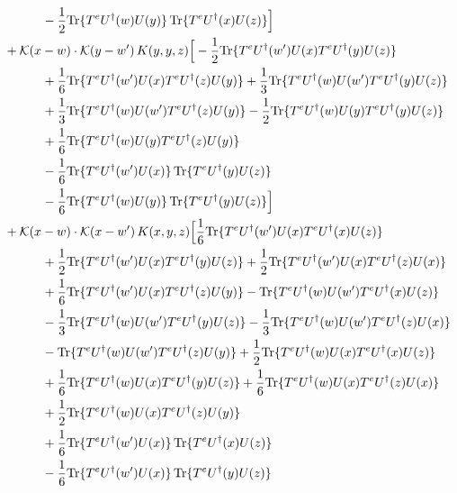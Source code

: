 \documentclass[10pt]{article}
\numberwithin{equation}{section}
\begin{document}
\begin{align}
&\quad\quad\quad-\frac{1}{2}{\rm Tr}\{T^eU^\dagger(w)U(y)\}\,{\rm Tr}\{T^eU^\dagger(x)U(z)\}\Big]\notag\\
&+\mathcal K(x-w)\cdot\mathcal K(y-w')\,K(y,y,z)\Big[-\frac{1}{2}{\rm Tr}\{T^eU^\dagger(w')U(x)T^eU^\dagger(y)U(z)\}\notag\\
&\quad\quad\quad+\frac{1}{6}{\rm Tr}\{T^eU^\dagger(w')U(x)T^eU^\dagger(z)U(y)\}+\frac{1}{3}{\rm Tr}\{T^eU^\dagger(w)U(w')T^eU^\dagger(y)U(z)\}\notag\\
&\quad\quad\quad+\frac{1}{3}{\rm Tr}\{T^eU^\dagger(w)U(w')T^eU^\dagger(z)U(y)\}-\frac{1}{2}{\rm Tr}\{T^eU^\dagger(w)U(y)T^eU^\dagger(y)U(z)\}\notag\\
&\quad\quad\quad+\frac{1}{6}{\rm Tr}\{T^eU^\dagger(w)U(y)T^eU^\dagger(z)U(y)\}\notag\\
&\quad\quad\quad-\frac{1}{6}{\rm Tr}\{T^eU^\dagger(w')U(x)\}\,{\rm Tr}\{T^eU^\dagger(y)U(z)\}\notag\\
&\quad\quad\quad-\frac{1}{6}{\rm Tr}\{T^eU^\dagger(w)U(y)\}\,{\rm Tr}\{T^eU^\dagger(y)U(z)\}\Big]\notag\\
&+\mathcal K(x-w)\cdot\mathcal K(x-w')\,K(x,y,z)\Big[\frac{1}{6}{\rm Tr}\{T^eU^\dagger(w')U(x)T^eU^\dagger(x)U(z)\}\notag\\
&\quad\quad\quad+\frac{1}{2}{\rm Tr}\{T^eU^\dagger(w')U(x)T^eU^\dagger(y)U(z)\}+\frac{1}{2}{\rm Tr}\{T^eU^\dagger(w')U(x)T^eU^\dagger(z)U(x)\}\notag\\
&\quad\quad\quad+\frac{1}{6}{\rm Tr}\{T^eU^\dagger(w')U(x)T^eU^\dagger(z)U(y)\}-{\rm Tr}\{T^eU^\dagger(w)U(w')T^eU^\dagger(x)U(z)\}\notag\\
&\quad\quad\quad-\frac{1}{3}{\rm Tr}\{T^eU^\dagger(w)U(w')T^eU^\dagger(y)U(z)\}-\frac{1}{3}{\rm Tr}\{T^eU^\dagger(w)U(w')T^eU^\dagger(z)U(x)\}\notag\\
&\quad\quad\quad-{\rm Tr}\{T^eU^\dagger(w)U(w')T^eU^\dagger(z)U(y)\}+\frac{1}{2}{\rm Tr}\{T^eU^\dagger(w)U(x)T^eU^\dagger(x)U(z)\}\notag\\
&\quad\quad\quad+\frac{1}{6}{\rm Tr}\{T^eU^\dagger(w)U(x)T^eU^\dagger(y)U(z)\}+\frac{1}{6}{\rm Tr}\{T^eU^\dagger(w)U(x)T^eU^\dagger(z)U(x)\}\notag\\
&\quad\quad\quad+\frac{1}{2}{\rm Tr}\{T^eU^\dagger(w)U(x)T^eU^\dagger(z)U(y)\}\notag\\
&\quad\quad\quad+\frac{1}{6}{\rm Tr}\{T^eU^\dagger(w')U(x)\}\,{\rm Tr}\{T^eU^\dagger(x)U(z)\}\notag\\
&\quad\quad\quad-\frac{1}{6}{\rm Tr}\{T^eU^\dagger(w')U(x)\}\,{\rm Tr}\{T^eU^\dagger(y)U(z)\}\notag\\

\end{align}
\end{document}
